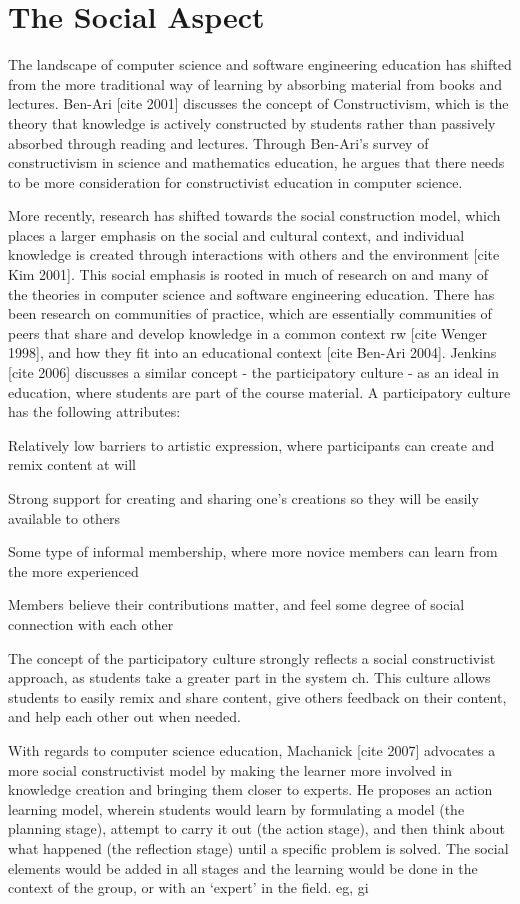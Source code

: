 \section{The Social Aspect}
The landscape of computer science and software engineering education has shifted from the more traditional way of learning by absorbing material from books and lectures. Ben-Ari [cite 2001] discusses the concept of Constructivism, which is the theory that knowledge is actively constructed by students rather than passively absorbed through reading and lectures. Through Ben-Ari’s survey of constructivism in science and mathematics education, he argues that there needs to be more consideration for constructivist education in computer science.

More recently, research has shifted towards the social construction model, which places a larger emphasis on the social and cultural context, and individual knowledge is created through interactions with others and the environment [cite Kim 2001]. This social emphasis is rooted in much of research on and many of the theories in computer science and software engineering education. There has been research on communities of practice, which are essentially communities of peers that share and develop knowledge in a common context {rw} [cite Wenger 1998], and how they fit into an educational context [cite Ben-Ari 2004].
Jenkins [cite 2006] discusses a similar concept - the participatory culture - as an ideal in education, where students are part of the course material. A participatory culture has the following attributes:

Relatively low barriers to artistic expression, where participants can create and remix content at will

Strong support for creating and sharing one’s creations so they will be easily available to others

Some type of informal membership, where more novice members can learn from the more experienced

Members believe their contributions matter, and feel some degree of social connection with each other

The concept of the participatory culture strongly reflects a social constructivist approach, as students take a greater part in the system {ch}. This culture allows students to easily remix and share content, give others feedback on their content, and help each other out when needed.

With regards to computer science education, Machanick [cite 2007] advocates a more social constructivist model by making the learner more involved in knowledge creation and bringing them closer to experts. He proposes an action learning model, wherein students would learn by formulating a model (the planning stage), attempt to carry it out (the action stage), and then think about what happened (the reflection stage) until a specific problem is solved. The social elements would be added in all stages and the learning would be done in the context of the group, or with an ‘expert’ in the field. {eg, gi}

